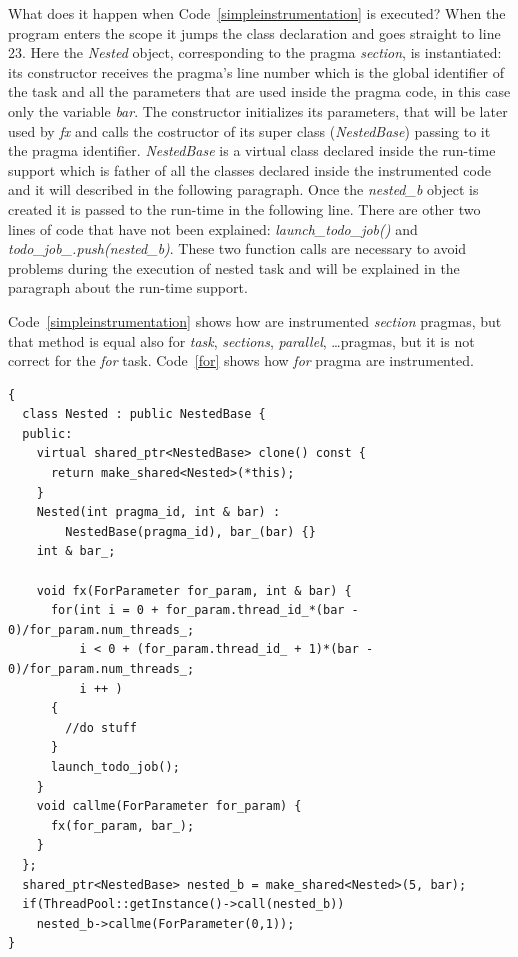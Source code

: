 \documentclass[a4paper,11pt,oneside]{book}
\begin{document}
What does it happen when Code~\ref{simpleinstrumentation} is executed? When the program enters the scope it jumps the class declaration and goes straight to line 23. Here the \emph{Nested} object, corresponding to the pragma \emph{section}, is instantiated: its constructor receives the pragma’s line number which is the global identifier of the task and all the parameters that are used inside the pragma code, in this case only the variable \emph{bar}. The constructor initializes its parameters, that will be later used by \emph{fx} and calls the costructor of its super class (\emph{NestedBase}) passing to it the pragma identifier.  \emph{NestedBase} is a virtual class declared inside the run-time support which is father of all the classes declared inside the instrumented code and it will described in the following paragraph. Once the \emph{nested\_b} object is created it is passed to the run-time in the following line. There are other two lines of code that have not been explained: \emph{launch\_todo\_job()} and \emph{todo\_job\_.push(nested\_b)}. These two function calls are necessary to avoid problems during the execution of nested task and will be explained in the paragraph about the run-time support.

Code~\ref{simpleinstrumentation} shows how are instrumented \emph{section} pragmas, but that method is equal also for \emph{task}, \emph{sections}, \emph{parallel}, \dots pragmas, but it is not correct for the \emph{for} task. Code~\ref{for} shows how \emph{for} pragma are instrumented.

\begin{lstlisting}[language=CCC, caption=Example of an instrumented \emph{for} pragma from Code~\ref{code}., label=for]
{
  class Nested : public NestedBase {
  public: 
    virtual shared_ptr<NestedBase> clone() const { 
      return make_shared<Nested>(*this);
    } 
    Nested(int pragma_id, int & bar) : 
        NestedBase(pragma_id), bar_(bar) {}
    int & bar_;

    void fx(ForParameter for_param, int & bar) {
      for(int i = 0 + for_param.thread_id_*(bar - 0)/for_param.num_threads_; 
          i < 0 + (for_param.thread_id_ + 1)*(bar - 0)/for_param.num_threads_; 
          i ++ )
      {
        //do stuff
      }  
      launch_todo_job(); 
    }
    void callme(ForParameter for_param) {
      fx(for_param, bar_);
    }
  };
  shared_ptr<NestedBase> nested_b = make_shared<Nested>(5, bar);
  if(ThreadPool::getInstance()->call(nested_b)) 
    nested_b->callme(ForParameter(0,1));
}
\end{lstlisting}
\end{document}
